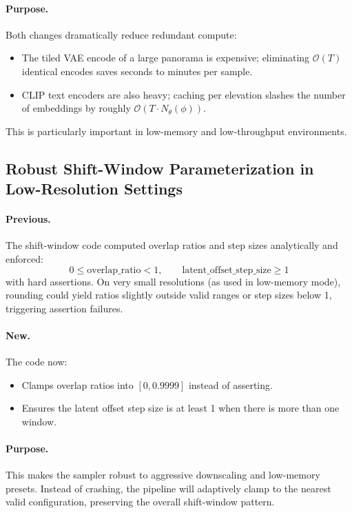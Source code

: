 \documentclass[11pt,a4paper]{article}
\begin{document}
\paragraph{Purpose.}
Both changes dramatically reduce redundant compute:
\begin{itemize}
    \item The tiled VAE encode of a large panorama is expensive; eliminating \(\mathcal{O}(T)\) identical encodes saves seconds to minutes per sample.
    \item CLIP text encoders are also heavy; caching per elevation slashes the number of embeddings by roughly \(\mathcal{O}(T \cdot N_\theta(\phi))\).
\end{itemize}
This is particularly important in low-memory and low-throughput environments.

\subsection{Robust Shift-Window Parameterization in Low-Resolution Settings}

\paragraph{Previous.}
The shift-window code computed overlap ratios and step sizes analytically and enforced:
\[
    0 \leq \text{overlap\_ratio} < 1, \qquad \text{latent\_offset\_step\_size} \geq 1
\]
with hard assertions.
On very small resolutions (as used in low-memory mode), rounding could yield ratios slightly outside valid ranges or step sizes below 1, triggering assertion failures.

\paragraph{New.}
The code now:
\begin{itemize}
    \item Clamps overlap ratios into \([0, 0.9999]\) instead of asserting.
    \item Ensures the latent offset step size is at least 1 when there is more than one window.
\end{itemize}

\paragraph{Purpose.}
This makes the sampler robust to aggressive downscaling and low-memory presets.
Instead of crashing, the pipeline will adaptively clamp to the nearest valid configuration, preserving the overall shift-window pattern.
\end{document}
